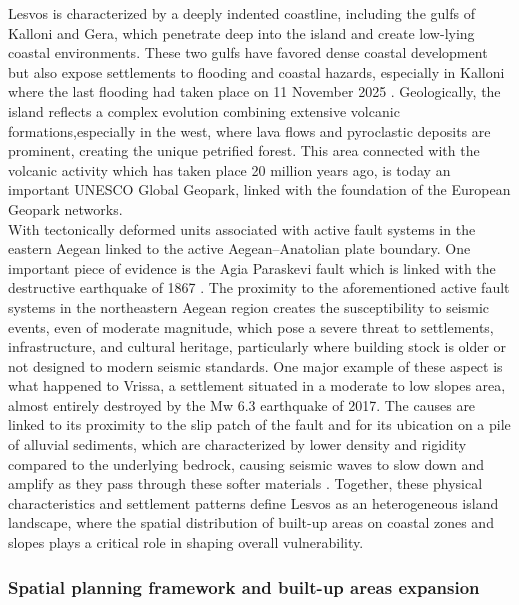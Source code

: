 \documentclass[10pt, twocolumn, twoside]{article}
\begin{document}
 Lesvos is characterized by a deeply indented coastline, including the gulfs of Kalloni and Gera, which penetrate deep into the island and create low-lying coastal environments. These two gulfs have favored dense coastal development but also expose settlements to flooding and coastal hazards, especially in Kalloni where the last flooding had taken place on 11 November 2025 \cite{tovima}. 
Geologically, the island reflects a complex evolution combining extensive volcanic formations,especially in the west, where lava flows and pyroclastic deposits are prominent, creating the unique petrified forest. This area connected with the volcanic activity which has taken place 20 million years ago, is today an important UNESCO Global Geopark, linked with the foundation of the European Geopark networks. \cite{geosciences13100296} \\
With tectonically deformed units associated with active fault systems in the eastern Aegean linked to the active Aegean–Anatolian plate boundary. One important piece of evidence is the Agia Paraskevi fault which is linked with the destructive earthquake of 1867 \cite{lesvosgeo}. 
The proximity to the aforementioned active fault systems in the northeastern Aegean region creates the susceptibility to seismic events, even of moderate magnitude, which pose a severe threat to settlements, infrastructure, and cultural heritage, particularly where building stock is older or not designed to modern seismic standards. One major example of these aspect is what happened to Vrissa, a settlement situated in a moderate to low slopes area, almost entirely destroyed by the Mw 6.3 earthquake of 2017. The causes are linked to its proximity to the slip patch of the fault and for its ubication on a pile of alluvial sediments, which are characterized by lower density and rigidity compared to the underlying bedrock, causing seismic waves to slow down and amplify as they pass through these softer materials \cite{Kiratzi2018LesvosEQ}.
Together, these physical characteristics and settlement patterns define Lesvos as an heterogeneous island landscape, where the spatial distribution of built-up areas on coastal zones and slopes plays a critical role in shaping overall vulnerability.

\subsubsection{Spatial planning framework and built-up areas expansion
}
\end{document}

